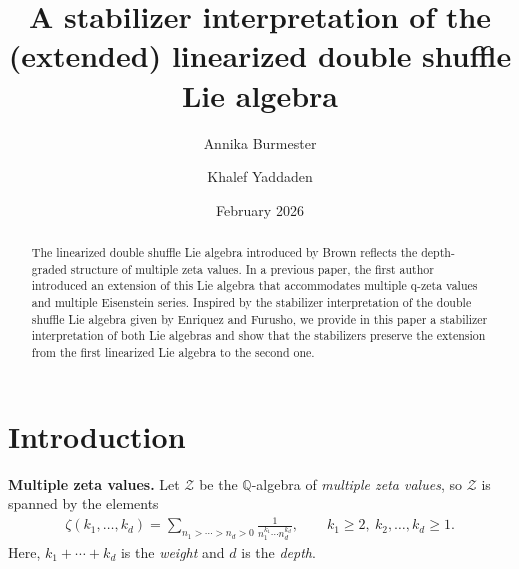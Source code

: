 \documentclass[11pt, a4paper]{amsart}
\title[A stabilizer interpretation of the linearized double shuffle Lie algebra]{A stabilizer interpretation of the (extended) linearized double shuffle Lie algebra}
\author{Annika Burmester}
\author{Khalef Yaddaden}
\date{February 2026}
\numberwithin{equation}{section}
\theoremstyle{definition}
\newcommand{\Q}{\mathbb{Q}}
\newcommand{\MZV}{\mathcal{Z}}
\begin{document}
\begin{abstract}
   The linearized double shuffle Lie algebra introduced by Brown reflects the depth-graded structure of multiple zeta values. In a previous paper, the first author introduced an extension of this Lie algebra that accommodates multiple q-zeta values and multiple Eisenstein series. Inspired by the stabilizer interpretation of the double shuffle Lie algebra given by Enriquez and Furusho, we provide in this paper a stabilizer interpretation of both Lie algebras and show that the stabilizers preserve the extension from the first linearized Lie algebra to the second one.
\end{abstract}

\maketitle

{\footnotesize \tableofcontents}

\section*{Introduction}

\textbf{Multiple zeta values.} Let $\MZV$ be the $\Q$-algebra of \emph{multiple zeta values}, so $\MZV$ is spanned by the elements
\begin{align*}
\zeta(k_1,\ldots,k_d)=\sum_{n_1>\cdots>n_d>0}\frac{1}{n_1^{k_1}\cdots n_d^{k_d}},\qquad k_1\geq2,\ k_2,\ldots,k_d\geq1.
\end{align*}
Here, $k_1+\cdots+k_d$ is the \emph{weight} and $d$ is the \emph{depth}.
\end{document}
